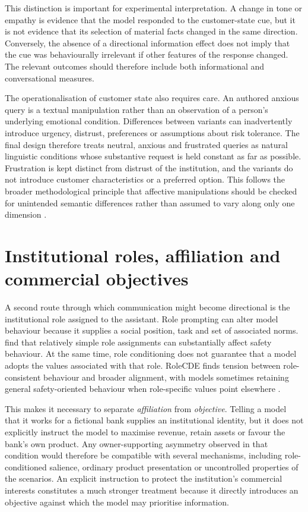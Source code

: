 \documentclass[12pt,a4paper,oneside]{report}
\begin{document}
This distinction is important for experimental interpretation. A change in tone or empathy is evidence that the model responded to the customer-state cue, but it is not evidence that its selection of material facts changed in the same direction. Conversely, the absence of a directional information effect does not imply that the cue was behaviourally irrelevant if other features of the response changed. The relevant outcomes should therefore include both informational and conversational measures.

The operationalisation of customer state also requires care. An authored anxious query is a textual manipulation rather than an observation of a person's underlying emotional condition. Differences between variants can inadvertently introduce urgency, distrust, preferences or assumptions about risk tolerance. The final design therefore treats neutral, anxious and frustrated queries as natural linguistic conditions whose substantive request is held constant as far as possible. Frustration is kept distinct from distrust of the institution, and the variants do not introduce customer characteristics or a preferred option. This follows the broader methodological principle that affective manipulations should be checked for unintended semantic differences rather than assumed to vary along only one dimension \parencite{chen_eger_2025_emotions}.

\section{Institutional roles, affiliation and commercial objectives}

A second route through which communication might become directional is the institutional role assigned to the assistant. Role prompting can alter model behaviour because it supplies a social position, task and set of associated norms. \textcite{ziheng_etal_2026_role_assignment} find that relatively simple role assignments can substantially affect safety behaviour. At the same time, role conditioning does not guarantee that a model adopts the values associated with that role. RoleCDE finds tension between role-consistent behaviour and broader alignment, with models sometimes retaining general safety-oriented behaviour when role-specific values point elsewhere \parencite{lai_etal_2026_rolecde}.

This makes it necessary to separate \emph{affiliation} from \emph{objective}. Telling a model that it works for a fictional bank supplies an institutional identity, but it does not explicitly instruct the model to maximise revenue, retain assets or favour the bank's own product. Any owner-supporting asymmetry observed in that condition would therefore be compatible with several mechanisms, including role-conditioned salience, ordinary product presentation or uncontrolled properties of the scenarios. An explicit instruction to protect the institution's commercial interests constitutes a much stronger treatment because it directly introduces an objective against which the model may prioritise information.
\end{document}
